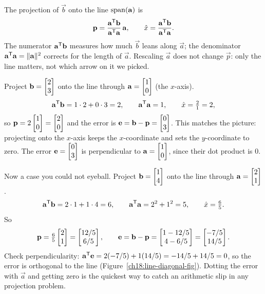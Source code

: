 \begin{focusbox}
The projection of $\vec{b}$ onto the line $\operatorname{span}(\mathbf{a})$ is
\[
  \mathbf{p} = \frac{\mathbf{a}^{\mathsf{T}}\mathbf{b}}{\mathbf{a}^{\mathsf{T}}\mathbf{a}}\,\mathbf{a},
  \qquad
  \hat{x} = \frac{\mathbf{a}^{\mathsf{T}}\mathbf{b}}{\mathbf{a}^{\mathsf{T}}\mathbf{a}}.
\]
The numerator $\mathbf{a}^{\mathsf{T}}\mathbf{b}$ measures how much $\vec{b}$ leans along $\vec{a}$; the denominator
$\mathbf{a}^{\mathsf{T}}\mathbf{a}=\lVert\mathbf{a}\rVert^2$ corrects for the length of $\vec{a}$. Rescaling $\vec{a}$ does not
change $\vec{p}$: only the line matters, not which arrow on it we picked.
\end{focusbox}

\begin{example}\label{ch18:line-numeric}
Project $\mathbf{b}=\begin{bmatrix}2\\3\end{bmatrix}$ onto the line through $\mathbf{a}=\begin{bmatrix}1\\0\end{bmatrix}$ (the $x$-axis).
\[
  \mathbf{a}^{\mathsf{T}}\mathbf{b} = 1\cdot 2 + 0\cdot 3 = 2,
  \qquad
  \mathbf{a}^{\mathsf{T}}\mathbf{a} = 1,
  \qquad
  \hat{x} = \tfrac{2}{1} = 2,
\]
so $\mathbf{p} = 2\begin{bmatrix}1\\0\end{bmatrix} = \begin{bmatrix}2\\0\end{bmatrix}$ and the error is
$\mathbf{e} = \mathbf{b}-\mathbf{p} = \begin{bmatrix}0\\3\end{bmatrix}$. This matches the picture: projecting onto the $x$-axis
keeps the $x$-coordinate and sets the $y$-coordinate to zero. The error $\mathbf{e}=\begin{bmatrix}0\\3\end{bmatrix}$ is
perpendicular to $\mathbf{a}=\begin{bmatrix}1\\0\end{bmatrix}$, since their dot product is $0$.
\end{example}

\begin{example}\label{ch18:line-diagonal}
Now a case you could not eyeball. Project $\mathbf{b}=\begin{bmatrix}1\\4\end{bmatrix}$ onto the line through
$\mathbf{a}=\begin{bmatrix}2\\1\end{bmatrix}$.
\[
  \mathbf{a}^{\mathsf{T}}\mathbf{b} = 2\cdot1 + 1\cdot4 = 6,
  \qquad
  \mathbf{a}^{\mathsf{T}}\mathbf{a} = 2^2 + 1^2 = 5,
  \qquad
  \hat{x} = \tfrac{6}{5}.
\]
So
\[
  \mathbf{p} = \tfrac{6}{5}\begin{bmatrix}2\\1\end{bmatrix} = \begin{bmatrix}12/5\\6/5\end{bmatrix},
  \qquad
  \mathbf{e} = \mathbf{b}-\mathbf{p} = \begin{bmatrix}1-12/5\\ 4-6/5\end{bmatrix} = \begin{bmatrix}-7/5\\14/5\end{bmatrix}.
\]
Check perpendicularity: $\mathbf{a}^{\mathsf{T}}\mathbf{e} = 2(-7/5)+1(14/5) = -14/5+14/5 = 0$, so the error is
orthogonal to the line (Figure~\ref{ch18:line-diagonal-fig}). Dotting the error with $\vec{a}$ and
getting zero is the quickest way to catch an arithmetic slip in any projection problem.
\end{example}

